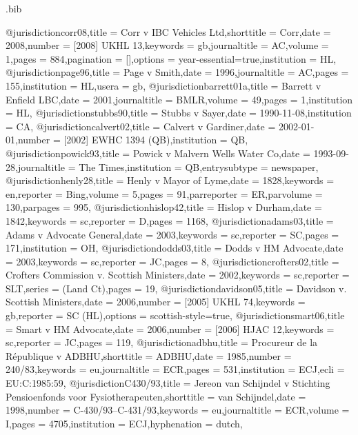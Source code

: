 
\begin{filecontents*}[overwrite]{\jobname.bib}

@jurisdiction{corr08,title = {Corr v IBC Vehicles Ltd},shorttitle = {Corr},date = {2008},number = {[2008]  UKHL 13},keywords = {gb},journaltitle = {AC},volume = {1},pages = {884},pagination = {[]},options = {year-essential=true},institution = {HL},}
@jurisdiction{page96,title = {Page v Smith},date = {1996},journaltitle = {AC},pages = {155},institution = {HL},usera = {gb},}
@jurisdiction{barrett01a,title = {Barrett v Enfield LBC},date = {2001},journaltitle = {BMLR},volume = {49},pages = {1},institution = {HL},}
@jurisdiction{stubbs90,title = {Stubbs v Sayer},date = { 1990-11-08},institution = {CA},}
@jurisdiction{calvert02,title = {Calvert v Gardiner},date = { 2002-01-01},number = {[2002] EWHC 1394 (QB)},institution = {QB},}
@jurisdiction{powick93,title = {Powick v Malvern Wells Water Co},date = {1993-09-28},journaltitle = {The Times},institution = {QB},entrysubtype = {newspaper},}
@jurisdiction{henly28,title = {Henly v Mayor of Lyme},date = {1828},keywords = {en},reporter = {Bing},volume = {5},pages = {91},parreporter = {ER},parvolume = {130},parpages = {995},}
@jurisdiction{hislop42,title = {Hislop v Durham},date = {1842},keywords = {sc},reporter = {D},pages = {1168},}
@jurisdiction{adams03,title = {Adams v Advocate General},date = {2003},keywords = {sc},reporter = {SC},pages = {171},institution = {OH},}
@jurisdiction{dodds03,title = {Dodds v HM Advocate},date = {2003},keywords = {sc},reporter = {JC},pages = {8},}
@jurisdiction{crofters02,title = {Crofters Commission v. Scottish Ministers},date = {2002},keywords = {sc},reporter = {SLT},series = {(Land Ct)},pages = {19},}
@jurisdiction{davidson05,title = {Davidson v. Scottish Ministers},date = {2006},number = {[2005] UKHL 74},keywords = {gb},reporter = {SC (HL)},options = {scottish-style=true},}
@jurisdiction{smart06,title = {Smart v HM Advocate},date = {2006},number = {[2006] HJAC 12},keywords = {sc},reporter = {JC},pages = {119},}
@jurisdiction{adbhu,title = {Procureur de la République v ADBHU},shorttitle = {ADBHU},date = {1985},number = {240/83},keywords = {eu},journaltitle = {ECR},pages = {531},institution = {ECJ},ecli = {EU:C:1985:59},}
@jurisdiction{C430/93,title = {Jereon van Schijndel v Stichting Pensioenfonds voor Fysiotherapeuten},shorttitle = {van Schijndel},date = {1998},number = {C-430/93--C-431/93},keywords = {eu},journaltitle = {ECR},volume = {I},pages = {4705},institution = {ECJ},hyphenation = {dutch},}


\end{filecontents*}




